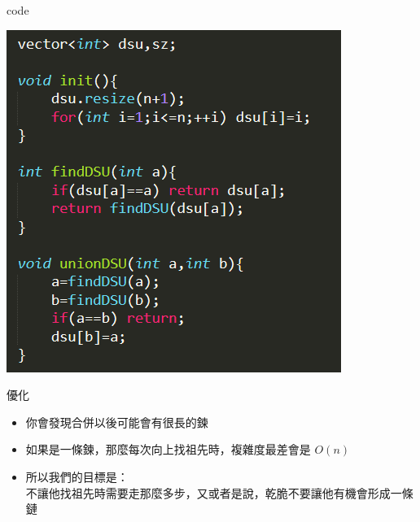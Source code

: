 \documentclass[aspectratio=169]{beamer}
\begin{document}
    \begin{frame}{code}
        \begin{center}
            \includegraphics[scale=0.6]{code/dsu_basic.png}
        \end{center}
    \end{frame}
    \begin{frame}{優化}
        \begin{itemize}
            \item 你會發現合併以後可能會有很長的鍊
            \item<2-> 如果是一條鍊，那麼每次向上找祖先時，複雜度最差會是 $O(n)$
            \item<3-> 所以我們的目標是：\\
            不讓他找祖先時需要走那麼多步，又或者是說，乾脆不要讓他有機會形成一條鏈
        \end{itemize}
    \end{frame}
\end{document}
